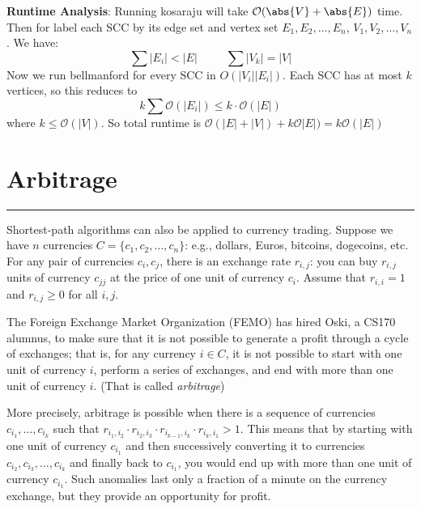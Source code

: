 \documentclass{article}
\begin{document}
\begin{answer}
        \textbf{Runtime Analysis}: Running kosaraju will take $\mathcal{O}(\abs{V} +\abs{E})$ time. Then for label each SCC by its edge set and vertex set $E_{1}, E_{2}, \ldots, E_{n}$, $V_{1}, V_{2}, \ldots, V_{n}$. We have:
            \begin{equation*}
                \sum \lvert E_{i} \rvert < \lvert E \rvert \hspace{30pt}  \sum \lvert V_{k} \rvert = \lvert V \rvert
            \end{equation*}
        Now we run bellmanford for every SCC in $O(\lvert V_{i} \rvert\lvert E_{i} \rvert)$. Each SCC has at most $k$ vertices, so this reduces to 
            \begin{equation*}
                k\sum \mathcal{O}(\lvert E_{i} \rvert) \leq k \cdot \mathcal{O}(\lvert E \rvert)
            \end{equation*}
        where $k \leq \mathcal{O}(\lvert V \rvert)$. So total runtime is $\mathcal{O}(\lvert E \rvert + \lvert V \rvert) + k\mathcal{O}\lvert E \rvert) = k \mathcal{O}(\lvert E \rvert)$
    \end{answer}

\newpage
\section*{Arbitrage}
\hrule

Shortest-path algorithms can also be applied to currency trading. Suppose we have $n$ currencies $C = \{c_{1}, c_{2}, \ldots, c_{n}\}$: e.g., dollars, Euros, bitcoins, dogecoins, etc. For any pair of currencies $c_{i}, c_{j}$, there is an exchange rate $r_{i, j}$: you can buy $r_{i, j}$ units of currency $c_{jj}$ at the price of one unit of currency $c_{i}$. Assume that $r_{i, i} = 1$ and $r_{i, j} \geq 0$ for all $i, j$.

The Foreign Exchange Market Organization (FEMO) has hired Oski, a CS170 alumnus, to make sure that it is not possible to generate a profit through a cycle of exchanges; that is, for any currency $i \in C$, it is not possible to start with one unit of currency $i$, perform a series of exchanges, and end with more than one unit of currency $i$. (That is called \textit{arbitrage})

More precisely, arbitrage is possible when there is a sequence of currencies $c_{i_{1}}, \ldots, c_{i_{k}}$ such that $r_{i_{1}, i_{2}} \cdot r_{i_{2}, i_{3}} \cdot r_{i_{k - 1}, i_{k}} \cdot r_{i_{k}, i_{1}} > 1$. This means that by starting with one unit of currency $c_{i_{1}}$ and then successively converting it to currencies $c_{i_{2}}, c_{i_{3}}, \ldots, c_{i_{k}}$ and finally back to $c_{i_{1}}$, you would end up with more than one unit of currency $c_{i_{1}}$. Such anomalies last only a fraction of a minute on the currency exchange, but they provide an opportunity for profit.
\end{document}
